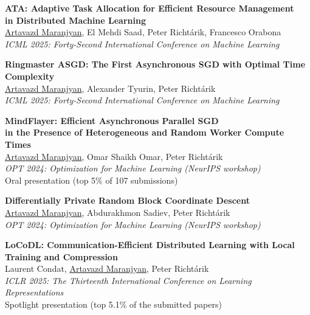 \documentclass[11pt,a4paper,sans]{moderncv}        %
\newcommand{\red}{\color{cherry}}
\newcommand{\highlight}[1]{{\red #1}}
\begin{document}
\begin{etaremune}

\item \textbf{ATA: Adaptive Task Allocation for Efficient Resource Management \\ in Distributed Machine Learning}\\
\underline{Artavazd Maranjyan}, El Mehdi Saad, Peter Richtárik, Francesco Orabona\\
\textit{ICML 2025: Forty-Second International Conference on Machine Learning}

\item \textbf{Ringmaster ASGD: The First Asynchronous SGD with Optimal Time Complexity}\\
\underline{Artavazd Maranjyan}, Alexander Tyurin, Peter Richtárik\\
\textit{ICML 2025: Forty-Second International Conference on Machine Learning}

\item \textbf{MindFlayer: Efficient Asynchronous Parallel SGD \\ in the Presence of Heterogeneous and Random Worker Compute Times}\\
\underline{Artavazd Maranjyan}, Omar Shaikh Omar, Peter Richtárik\\
\textit{OPT 2024: Optimization for Machine Learning (NeurIPS workshop)}\\
\highlight{Oral presentation (top 5\% of 107 submissions)}

\item \textbf{Differentially Private Random Block Coordinate Descent}\\
\underline{Artavazd Maranjyan}, Abdurakhmon Sadiev, Peter Richtárik\\
\textit{OPT 2024: Optimization for Machine Learning (NeurIPS workshop)}

\item \textbf{LoCoDL: Communication-Efficient Distributed Learning with Local Training and Compression}\\
Laurent Condat, \underline{Artavazd Maranjyan}, Peter Richtárik\\
\textit{ICLR 2025: The Thirteenth International Conference on Learning Representations}\\
\highlight{Spotlight presentation (top 5.1\% of the submitted papers)}


\end{etaremune}
\end{document}

